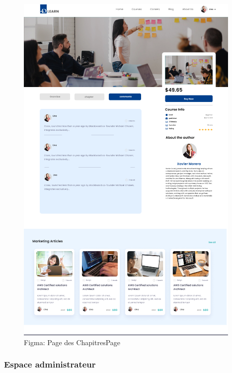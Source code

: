 \begin{figure}[H]
\begin{minipage}{0.45\textwidth}
        \includegraphics[width=\textwidth]{Figures/comment.PNG}
        \caption{Figma: Page des ChapitresPage }
    \end{minipage}
    
\end{figure}

\subsubsection{Espace administrateur}

